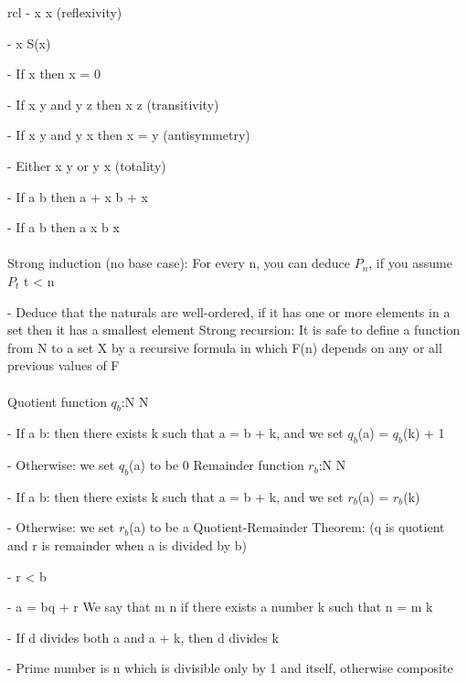 \documentclass{article}
\begin{document}
\begin{arrary}{rcl}
- \math x \leq x\) (reflexivity)

- \math x \leq S(x)\)

- If \math x \) then \math x = 0\)

- If \math x \leq y\) and \math y \leq z\) then \math x \leq z\) (transitivity)

- If \math x \leq y\) and \math y \leq x\) then \math x = y\) (antisymmetry)

- Either \math x \leq y\) or \math y \leq x\) (totality)

- If \math a \leq b\) then \math a + x \leq b + x\) 

- If \math a \leq b\) then \math a \times x \leq b \times x\)
\\
\\
Strong induction (no base case): For every n, you can deduce $P_n$, if you assume $P_t$ \forall t < n\)

- Deduce that the naturals are well-ordered, if it has one or more elements in a set then it has a smallest element
\newline Strong recursion: It is safe to define a function from N to a set X by a recursive formula in which F(n) depends on any or all previous values of F
\\
\\
Quotient function \math $q_b$:N \rightarrow N\)

- If \math a \geq b\): then there exists k such that \math a = b + k\), and we set \math $q_b$(a) = $q_b$(k) + 1\)

- Otherwise: we set \math $q_b$(a)\) to be 0
\newline Remainder function \math $r_b$:N \rightarrow N\)

- If \math a \geq b\): then there exists k such that \math a = b + k\), and we set \math $r_b$(a) = $r_b$(k)\)

- Otherwise: we set \math $r_b$(a)\) to be a
\newline Quotient-Remainder Theorem: (q is quotient and r is remainder when a is divided by b)

-  \leq r < b\)

- \math a = bq + r\)
\newline We say that \math m \vert n\) if there exists a number k such that \math n = m \times k\)

- If d divides both a and \math a + k\), then d divides k

- Prime number is \math n \) which is divisible only by 1 and itself, otherwise composite


\end{arrary}
\end{document}
